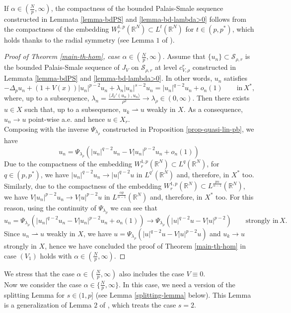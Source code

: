 \documentclass[11pt,reqno]{amsart}
\theoremstyle{definition}
\numberwithin{equation}{section}
\numberwithin{theorem}{section}
\numberwithin{equation}{section}
\numberwithin{theorem}{section}
\newcommand{\R}{\mathbb{R}}
\begin{document}
If $\alpha\in(\frac{N}{p},\infty)$, the compactness of the bounded Palais-Smale sequence constructed in Lemmata \ref{lemma-bdPS} and \ref{lemma-bd-lambda>0} follows from the compactness of the embedding $W^{1,p}_r(\R^N)\subset L^t(\R^N)$ for $t\in(p,p^*)$, which holds thanks to the radial symmetry (see Lemma $1$ of \cite{dhara2025normalised}).\\

\begin{proof}[Proof of Theorem \ref{main-th-hom}, case $\alpha\in(\frac{N}{p},\infty)$]
Assume that $\{u_n\}\subset \mathcal{S}_{\rho,r}$ is the bounded Palais-Smale sequence of $J_V$ on $\mathcal{S}_{\rho,r}$ at level $c^r_{V,\rho}$ constructed in Lemmata \ref{lemma-bdPS} and \ref{lemma-bd-lambda>0}. In other words, $u_n$ satisfies
$$-\Delta_p u_n+(1+V(x))|u_n|^{p-2}u_n+\lambda_n |u_n|^{s-2}u_n=|u_n|^{q-2}u_n+o_n(1)\qquad\text{in}\,X^*,$$
where, up to a subsequence, $\lambda_n=\frac{\langle J_V'(u_n),u_n\rangle}{\rho^2}\to \lambda_\rho\in(0,\infty)$. Then there exists $u\in X$ such that, up to a subsequence, $u_k\rightharpoonup u$ weakly in $X$. As a consequence, $u_n\to u$ point-wise a.e. and hence $u\in X_r$. \\

Composing with the inverse $\Psi_{\lambda_\rho}$ constructed in Proposition \ref{prop-quasi-lin-pb}, we have $$u_n=\Psi_{\lambda_\rho}(|u_n|^{q-2}u_n-V|u_n|^{p-2}u_n+o_n(1))$$ 
Due to the compactness of the embedding $W^{1,p}_r(\R^N)\subset L^q(\R^N)$, for $q\in(p,p^*)$, we have $|u_n|^{q-2}u_n\to|u|^{q-2}u$ in $L^{q'}(\R^N)$ and, therefore, in $X^*$ too. Similarly, due to the compactness of the embedding $W^{1,p}_r(\R^N)\subset L^{\frac{p\alpha}{\alpha-1}}(\R^N)$, we have $V|u_n|^{p-2}u_n\to V|u|^{p-2}u$ in $L^{\frac{\alpha p}{\alpha -1}}(\R^N)$ and, therefore, in $X^*$ too. For this reason, using the continuity of $\Psi_{\lambda_\rho}$ we can see that $$u_n=\Psi_{\lambda_\rho}(|u_n|^{q-2}u_n-V|u_n|^{p-2}u_n+o_n(1))\to\Psi_{\lambda_\rho}(|u|^{q-2}u-V|u|^{p-2})\qquad\text{strongly in}\,X.$$
Since $u_n\rightharpoonup u$ weakly in $X$, we have $u=\Psi_{\lambda_\rho}(|u|^{q-2}u-V|u|^{p-2}u)$ and $u_k\to u$ strongly in $X$, hence we have concluded the proof of Theorem \ref{main-th-hom} in case $(V_1)$ holds with $\alpha\in (\frac{N}{p},\infty)$.
\end{proof}
We stress that the case $\alpha\in(\frac{N}{p},\infty)$ also includes the case $V\equiv 0$.\\
Now we consider the case $\alpha\in\{\frac{N}{p},\infty\}$. In this case, we need a version of the splitting Lemma for $s\in(1,p]$ (see Lemma \ref{splitting-lemma} below). This Lemma is a generalization of Lemma $2$ of \cite{dhara2025normalised}, which treats the case $s=2$.\\
\end{document}
